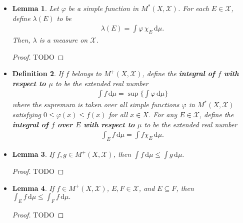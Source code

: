 \documentclass[10pt]{article}
\newtheorem{lemma}{Lemma}
\newtheorem{definition}[lemma]{Definition}
\newcommand{\dee}{\mathrm{d}}
\newcommand{\mcal}[1]{\mathcal{#1}}
\begin{document}
\begin{itemize}
  \begin{proof}
    TODO
  \end{proof}

  \item \begin{lemma}
  Let $\varphi$ be a simple function in $M^*(X, \mcal{X})$. For each $E \in \mcal{X}$, define $\lambda(E)$ to be
  \begin{align*}
    \lambda(E) = \int \varphi\, \chi_{E}\, \dee\mu.
  \end{align*}
  Then, $\lambda$ is a measure on $\mcal{X}$.
  \end{lemma}

  \begin{proof}
    TODO
  \end{proof}

  \item \begin{definition}
    If $f$ belongs to $M^+(X, \mcal{X})$, define the {\bf integral of $f$ with respect to $\mu$} to be the extended real number
    \begin{align*}
      \int f\, \dee\mu = \sup \bigg\{ \int \varphi\, \dee\mu \bigg\}
    \end{align*}
    where the supremum is taken over all simple functions $\varphi$ in $M^*(X, \mcal{X})$ satisfying $0 \leq \varphi(x) \leq f(x)$ for all $x \in X$. For any $E \in \mcal{X}$, define the {\bf integral of $f$ over $E$ with respect to $\mu$} to be the extended real number
    \begin{align*}
        \int_E f\, \dee \mu = \int f\chi_E\, \dee\mu.
    \end{align*}
  \end{definition}

  \item \begin{lemma}
    If $f,g \in M^+(X,\mcal{X})$, then
    $\int f\, \dee\mu \leq \int g\, \dee\mu.$    
  \end{lemma}

  \begin{proof}
    TODO
  \end{proof}

  \item \begin{lemma}
    If $f \in M^+(X,\mcal{X})$, $E,F \in \mcal{X}$, and $E \subseteq F$, then    
    $\int_E f\, \dee\mu \leq \int_F f\, \dee\mu.$    
  \end{lemma}

  \begin{proof}
    TODO
  \end{proof}


\end{itemize}
\end{document}
